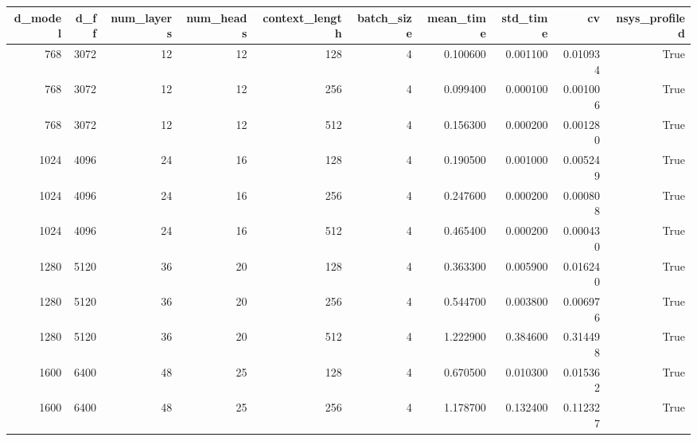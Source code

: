 \begin{tabular}{rrrrrrrrrr}
\toprule
d_model & d_ff & num_layers & num_heads & context_length & batch_size & mean_time & std_time & cv & nsys_profiled \\
\midrule
768 & 3072 & 12 & 12 & 128 & 4 & 0.100600 & 0.001100 & 0.010934 & True \\
768 & 3072 & 12 & 12 & 256 & 4 & 0.099400 & 0.000100 & 0.001006 & True \\
768 & 3072 & 12 & 12 & 512 & 4 & 0.156300 & 0.000200 & 0.001280 & True \\
1024 & 4096 & 24 & 16 & 128 & 4 & 0.190500 & 0.001000 & 0.005249 & True \\
1024 & 4096 & 24 & 16 & 256 & 4 & 0.247600 & 0.000200 & 0.000808 & True \\
1024 & 4096 & 24 & 16 & 512 & 4 & 0.465400 & 0.000200 & 0.000430 & True \\
1280 & 5120 & 36 & 20 & 128 & 4 & 0.363300 & 0.005900 & 0.016240 & True \\
1280 & 5120 & 36 & 20 & 256 & 4 & 0.544700 & 0.003800 & 0.006976 & True \\
1280 & 5120 & 36 & 20 & 512 & 4 & 1.222900 & 0.384600 & 0.314498 & True \\
1600 & 6400 & 48 & 25 & 128 & 4 & 0.670500 & 0.010300 & 0.015362 & True \\
1600 & 6400 & 48 & 25 & 256 & 4 & 1.178700 & 0.132400 & 0.112327 & True \\
\bottomrule
\end{tabular}

